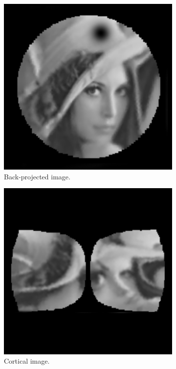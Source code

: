 \documentclass{l4proj}
\begin{document}
\begin{figure}[H]

  \begin{subfigure}[b]{0.5\textwidth}
    \includegraphics[width=\textwidth]{l4template-master/images/back2.png}
    \caption{Back-projected image.}
    \label{backprojected}
  \end{subfigure}
  \begin{subfigure}[b]{0.5\textwidth}
    \includegraphics[width=\textwidth]{l4template-master/images/cort_lena2.png}
    \caption{Cortical image.}
    \label{cortical}
  \end{subfigure} 
  \caption{}
  \label{retina}
 \end{figure}
\end{document}
